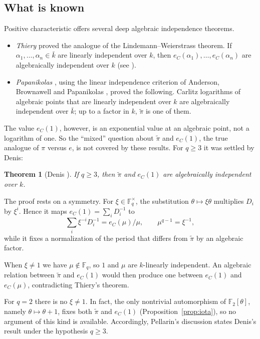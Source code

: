 \documentclass[11pt]{amsart}
\newtheorem*{theoremstar}{Theorem}
\theoremstyle{remark}
\numberwithin{equation}{section}
\newcommand{\F}{\mathbb{F}}
\newcommand{\pit}{\tilde\pi}
\newcommand{\eC}{e_C}
\begin{document}
\subsection{What is known}
Positive characteristic offers several deep algebraic independence theorems.
\begin{itemize}
\item \emph{Thiery} \cite{Thi92} proved the analogue of the Lindemann--Weierstrass theorem. If $\alpha_1,\dots,\alpha_n\in\bar k$ are linearly independent over $k$, then $\eC(\alpha_1),\dots,\eC(\alpha_n)$ are algebraically independent over $k$ (see \cite[\S2]{Pel17}).
\item \emph{Papanikolas} \cite{Pap08}, using the linear independence criterion of Anderson, Brownawell and Papanikolas \cite{ABP04}, proved the following. Carlitz logarithms of algebraic points that are linearly independent over $k$ are algebraically independent over $\bar k$; up to a factor in $k$, $\pit$ is one of them.
\end{itemize}
The value $\eC(1)$, however, is an exponential value at an algebraic point, not a logarithm of one. So the ``mixed'' question about $\pit$ and $\eC(1)$, the true analogue of $\pi$ versus $e$, is not covered by these results. For $q\ge3$ it was settled by Denis:

\begin{theoremstar}[{Denis \cite[Cor.~2(a)]{Den95}}]
If $q\ge3$, then $\pit$ and $\eC(1)$ are algebraically independent over $k$.
\end{theoremstar}

The proof rests on a symmetry. For $\xi\in\F_q^\times$, the substitution $\theta\mapsto\xi\theta$ multiplies $D_i$ by $\xi^i$. Hence it maps $\eC(1)=\sum_iD_i^{-1}$ to
\[
\sum_i\xi^{-i}D_i^{-1}=\eC(\mu)/\mu,\qquad \mu^{q-1}=\xi^{-1},
\]
while it fixes a normalization of the period that differs from $\pit$ by an algebraic factor.

When $\xi\ne1$ we have $\mu\notin\F_q$, so $1$ and $\mu$ are $k$-linearly independent. An algebraic relation between $\pit$ and $\eC(1)$ would then produce one between $\eC(1)$ and $\eC(\mu)$, contradicting Thiery's theorem.

For $q=2$ there is no $\xi\ne1$. In fact, the only nontrivial automorphism of $\F_2[\theta]$, namely $\theta\mapsto\theta+1$, fixes both $\pit$ and $\eC(1)$ (Proposition~\ref{prop:iota}), so no argument of this kind is available. Accordingly, Pellarin's discussion \cite[\S2]{Pel17} states Denis's result under the hypothesis $q\ge3$.
\end{document}
